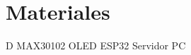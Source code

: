\documentclass[journal]{IEEEtran}
\begin{document}










\section{Materiales}

{\color{blue}D}
\newline
MAX30102
\newline
OLED
\newline
ESP32
\newline
Servidor
\newline
PC

\end{document}
